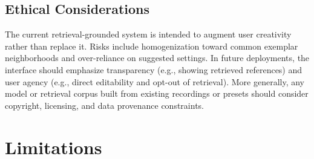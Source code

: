 \subsection{Ethical Considerations}

The current retrieval-grounded system is intended to augment user creativity rather than replace it. Risks include homogenization toward common exemplar neighborhoods and over-reliance on suggested settings. In future deployments, the interface should emphasize transparency (e.g., showing retrieved references) and user agency (e.g., direct editability and opt-out of retrieval). More generally, any model or retrieval corpus built from existing recordings or presets should consider copyright, licensing, and data provenance constraints.

\section{Limitations}
\label{sec:limitations}

